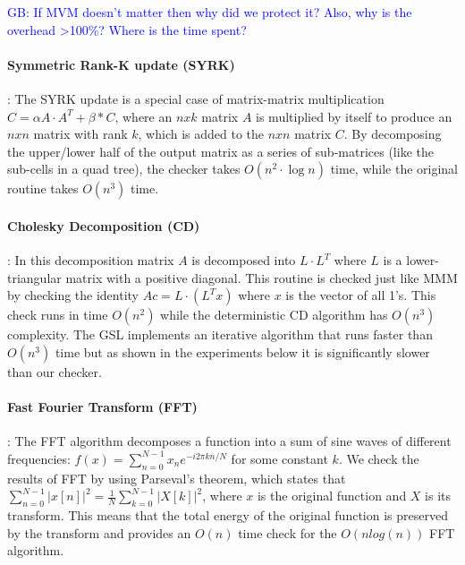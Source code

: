 \documentclass{sig-alternate}
\newcommand{\greg}[1]{%
  \textcolor{blue}{GB: #1}
}
\begin{document}
\greg{If MVM doesn't matter then why did we protect it? Also, why is the overhead >100\%? Where is the time spent?}

\paragraph{Symmetric Rank-K update (SYRK)}:
The SYRK update is a special case of matrix-matrix multiplication $C = \alpha A \cdot A^T + \beta*C$, where an $nxk$ matrix $A$ is multiplied by itself to produce an $nxn$ matrix with rank $k$, which is added to the $nxn$ matrix $C$.
By decomposing the upper/lower half of the output matrix as a series of sub-matrices (like the sub-cells in a quad tree), the checker takes $O(n^2 \cdot \log{n})$ time, while the original routine takes $O(n^3)$ time.

\paragraph{Cholesky Decomposition (CD)}:
In this decomposition matrix $A$ is decomposed into $L \cdot L^T$ where $L$ is a lower-triangular matrix with a positive diagonal.
This routine is checked just like MMM by checking the identity $Ac = L \cdot (L^T x)$ where $x$ is the vector of all 1's.
This check runs in time $O(n^2)$ while the deterministic CD algorithm has $O(n^3)$ complexity.
The GSL implements an iterative algorithm that runs faster than $O(n^3)$ time but as shown in the experiments below it is significantly slower than our checker.

\paragraph{Fast Fourier Transform (FFT)}:
The FFT algorithm decomposes a function into a sum of sine waves of different frequencies: $f(x) = \sum_{n=0}^{N-1} x_n e^{-i2\pi k n / N}$ for some constant $k$.
We check the results of FFT by using Parseval's theorem, which states that $\sum_{n=0}^{N-1} \left| x[n] \right|^2 = \frac{1}{N} \sum_{k=0}^{N-1} \left| X[k] \right|^2$, where $x$ is the original function and $X$ is its transform.
This means that the total energy of the original function is preserved by the transform and provides an $O(n)$ time check for the $O(n log(n))$ FFT algorithm.
\end{document}
